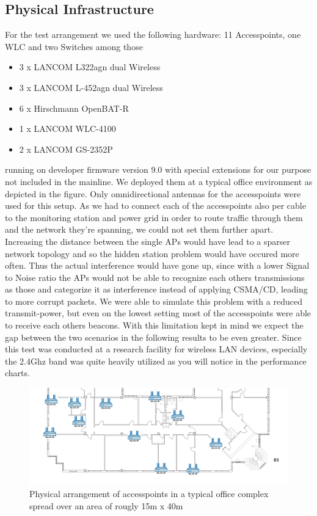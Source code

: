   \subsection{Physical Infrastructure}
    For the test arrangement we used the following hardware:
      11 Accesspoints, one WLC and two Switches among those
      \begin{itemize}
       \item 3 x LANCOM L322agn dual Wireless \cite{lancom}
       \item 3 x LANCOM L-452agn dual Wireless
       \item 6 x Hirschmann OpenBAT-R
       \item 1 x LANCOM WLC-4100
       \item 2 x LANCOM GS-2352P
      \end{itemize}
      running on developer firmware version 9.0 with special extensions for our purpose not included in the mainline.
      We deployed them at a typical office environment as depicted in the figure.
      Only omnidirectional antennas for the accesspoints were used for this setup. As we had to connect each of the accesspoints also
      per cable to the monitoring station and power grid in order to route traffic through them and the network they're spanning,
      we could not set them further apart.
      Increasing the distance between the single APs would have lead to a sparser network topology and so the hidden station problem would have occured
      more often. Thus the actual interference would have gone up, since with a lower Signal to Noise ratio the APs would not be able to recognize each others 
      transmissions as those and categorize it as interference instead of applying CSMA/CD, leading to more corrupt packets.
      We were able to simulate this problem with a reduced transmit-power,
      but even on the lowest setting most of the accesspoints were able to receive each others beacons. With this limitation kept in mind we expect
      the gap between the two scenarios in the following results to be even greater.
      Since this test was conducted at a research facility for wireless LAN devices, especially the 2.4Ghz band was quite heavily utilized as you will notice
      in the performance charts.
    \begin{figure}[h!]
      \centering
      \includegraphics[width=1\columnwidth]{figures/Lancom-flur-withaps}
      \caption{Physical arrangement of accesspoints in a typical office complex spread over an area of rougly 15m x 40m}
      \label{fig:2ndfloor}
    \end{figure}
